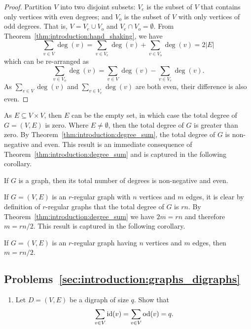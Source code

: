 \begin{proof}
Partition $V$ into two disjoint subsets: $V_e$ is the subset of $V$
that contains only vertices with even degrees; and $V_o$ is the subset
of $V$ with only vertices of odd degrees. That is, $V = V_e \cup V_o$
and $V_e \cap V_o = \emptyset$. From
Theorem~\ref{thm:introduction:hand_shaking}, we have
\[
\sum_{v \in V} \deg(v)
=
\sum_{v \in V_e} \deg(v) + \sum_{v \in V_o} \deg(v)
=
2 |E|
\]
which can be re-arranged as
\[
\sum_{v \in V_o} \deg(v)
=
\sum_{v \in V} \deg(v) - \sum_{v \in V_e} \deg(v).
\]
As $\sum_{v \in V} \deg(v)$ and $\sum_{v \in V_e} \deg(v)$ are both
even, their difference is also even.
\end{proof}

As $E \subseteq V \times V$, then $E$ can be the empty set, in which
case the total degree of $G = (V, E)$ is zero. Where $E \neq
\emptyset$, then the total degree of $G$ is greater than zero. By
Theorem~\ref{thm:introduction:degree_sum}, the total degree of $G$ is
non-negative and even. This result is an immediate consequence of
Theorem~\ref{thm:introduction:degree_sum} and is captured in the
following corollary.

\begin{corollary}
\label{cor:introduction:degree_sum_even}
If $G$ is a graph, then its total number of degrees is non-negative
and even.
\end{corollary}

If $G = (V, E)$ is an $r$-regular graph with $n$ vertices and $m$
edges, it is clear by definition of $r$-regular graphs that the total
degree of $G$ is $rn$. By Theorem~\ref{thm:introduction:degree_sum} we
have $2m = rn$ and therefore $m = rn / 2$. This result is captured in
the following corollary.

\begin{corollary}
If $G = (V, E)$ is an $r$-regular graph having $n$ vertices and $m$
edges, then $m = rn / 2$.
\end{corollary}



\subsection*{Problems~\ref{sec:introduction:graphs_digraphs}}

\begin{enumerate}
\item Let $D = (V, E)$ be a digraph of size $q$. Show that
  \[
  \sum_{v \in V} \operatorname*{id}(v)
  =
  \sum_{v \in V} \operatorname*{od}(v)
  =
  q.
  \]
\end{enumerate}


